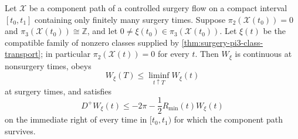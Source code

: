 \begin{theorem}
\label{thm:loop-width-forward-inequality}
\notready
Let $\mathcal X$ be a component path of a controlled surgery flow on a compact
interval $[t_0,t_1]$ containing only finitely many surgery times.  Suppose
$\pi_2(\mathcal X(t_0))=0$ and
$\pi_3(\mathcal X(t_0))\cong\mathbb Z$, and let
$0\ne\xi(t_0)\in\pi_3(\mathcal X(t_0))$.  Let
$\xi(t)$ be the compatible family of nonzero classes supplied by
\ref{thm:surgery-pi3-class-transport}; in particular
$\pi_2(\mathcal X(t))=0$ for every $t$.  Then
$W_\xi$ is continuous at nonsurgery times, obeys
\[
 W_\xi(T)\le\liminf_{t\uparrow T}W_\xi(t)
\]
at surgery times, and satisfies
\[
 D^+W_\xi(t)
 \le-2\pi-\frac12R_{\min}(t)W_\xi(t)
\]
on the immediate right of every time in $[t_0,t_1)$ for which the component
path survives.
\end{theorem}

